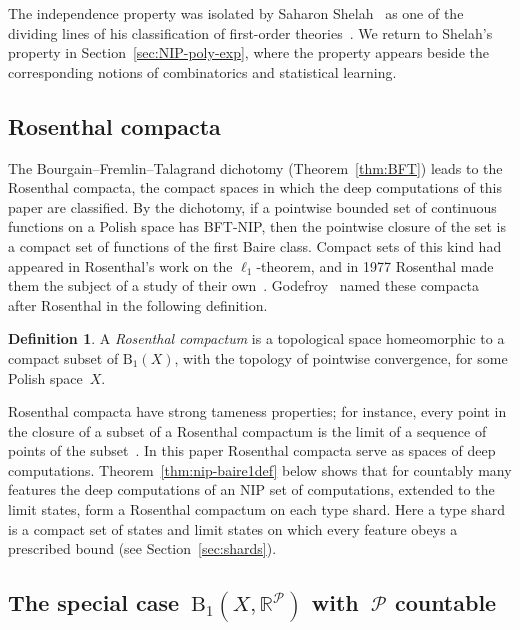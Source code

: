 \documentclass[psamsfonts]{amsart}
\theoremstyle{definition}
\newtheorem{defn}[thm]{Definition}
\theoremstyle{remark}
\numberwithin{equation}{section}
\begin{document}
The independence property was isolated by Saharon Shelah~\cite[Definition 4.1]{Shelah:1971} as one of the dividing lines of his classification of first-order theories~\cite{Shelah:1990}.
We return to Shelah's property in Section~\ref{sec:NIP-poly-exp}, where the property appears beside the corresponding notions of combinatorics and statistical learning.

\subsection{Rosenthal compacta}

The Bourgain--Fremlin--Talagrand dichotomy (Theorem~\ref{thm:BFT}) leads to the Rosenthal compacta, the compact spaces in which the deep computations of this paper are classified.
By the dichotomy, if a pointwise bounded set of continuous functions on a Polish space has BFT-NIP, then the pointwise closure of the set is a compact set of functions of the first Baire class.
Compact sets of this kind had appeared in Rosenthal's work on the $\ell_1$-theorem, and in 1977 Rosenthal made them the subject of a study of their own~\cite{Rosenthal:1977}.
Godefroy~\cite{Godefroy:1980} named these compacta after Rosenthal in the following definition.

\begin{defn}
  \label{def:Rosenthal-compacta}
  A \emph{Rosenthal compactum} is a topological space homeomorphic to a compact subset of $\mathrm{B}_1(X)$, with the topology of pointwise convergence, for some Polish space~$X$.
\end{defn}

Rosenthal compacta have strong tameness properties;
for instance, every point in the closure of a subset of a Rosenthal compactum is the limit of a sequence of points of the subset~\cite[Theorem~3F]{BFT_1978_PCompactBaire}.
In this paper Rosenthal compacta serve as spaces of deep computations.
Theorem~\ref{thm:nip-baire1def} below shows that for countably many features the deep computations of an NIP set of computations, extended to the limit states, form a Rosenthal compactum on each type shard.
Here a type shard is a compact set of states and limit states on which every feature obeys a prescribed bound (see Section~\ref{sec:shards}).

\subsection{The special case~\texorpdfstring{$\mathrm{B}_1(X,\mathbb{R}^\mathcal{P})$}{B\_1(X, R\textasciicircum P)} with~\texorpdfstring{$\mathcal{P}$}{P} countable}
\end{document}
